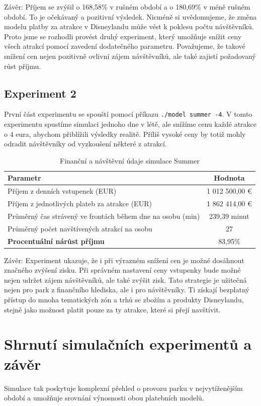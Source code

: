 \documentclass[a4paper,12pt]{article}
\begin{document}
Závěr: Příjem se zvýšil o 168,58\% v rušném období a o 180,69\%  v méně rušném období. To je očekávaný a pozitivní výsledek. Nicméně si uvědomujeme, že změna modelu platby za atrakce v Disneylandu může vést k poklesu počtu návštěvníků. Proto jsme se rozhodli provést druhý experiment, který umožňuje snížit ceny všech atrakcí pomocí zavedení dodatečného parametru. Považujeme, že takové snížení cen nejen pozitivně ovlivní zájem návštěvníků, ale také zajistí požadovaný růst příjmu.

\subsection{Experiment 2}
První část experimentu se spouští pomocí příkazu \texttt{./model summer -4}. V tomto experimentu spustíme simulaci jednoho dne v létě, ale snížíme cenu každé atrakce o 4 eura, abychom přiblížili výsledky realitě. Příliš vysoké ceny by totiž mohly odradit návštěvníky od vyzkoušení některé z atrakcí.

\begin{table}[h!]
	\centering
	\caption{Finanční a návštěvní údaje simulace Summer}
	\label{tab:financial_and_visit_data}
	\begin{tabular}{|l|c|}
		\hline
		\textbf{Parametr}                                         & \textbf{Hodnota} \\ \hline
		Příjem z denních vstupenek (EUR)                          & 1 012 500,00 €   \\ \hline
		Příjem z jednotlivých plateb za atrakce (EUR)             & 1 862 414,00 €   \\ \hline
		Průměrný čas strávený ve frontách během dne na osobu (min) & 239,39 minut     \\ \hline
		Průměrný počet navštívených atrakcí na osobu             & 27               \\ \hline
		\textbf{Procentuální nárůst příjmu}                       & 83,95\%         \\ \hline
	\end{tabular}
\end{table}

Závěr: Experiment ukazuje, že i při výrazném snížení cen je možné dosáhnout značného zvýšení zisku. Při správném nastavení ceny vstupenky bude možné nejen udržet zájem návštěvníků, ale také zvýšit zisk. Tato strategie je užitečná nejen pro park z finančního hlediska, ale i pro návštěvníky. Ti získají bezplatný přístup do mnoha tematických zón a trhů se zbožím a produkty Disneylandu, stejně jako možnost platit pouze za ty atrakce, které si přejí navštívit.

\section{Shrnutí simulačních experimentů a závěr}
Simulace tak poskytuje komplexní přehled o provozu parku v nejvytíženějším období a umožňuje srovnání výnosnosti obou platebních modelů.

 
\end{document}
